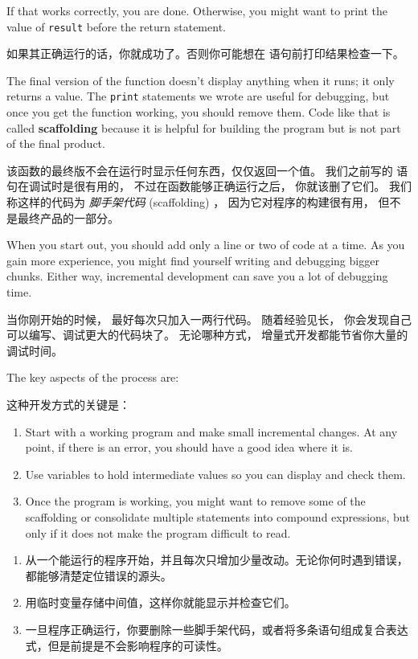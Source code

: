 %
If that works correctly, you are done.  Otherwise, you might
want to print the value of {\tt result} before the return
statement.

如果其正确运行的话，你就成功了。否则你可能想在  语句前打印结果检查一下。

The final version of the function doesn't display anything when it
runs; it only returns a value.  The {\tt print} statements we wrote
are useful for debugging, but once you get the function working, you
should remove them.  Code like that is called {\bf scaffolding}
because it is helpful for building the program but is not part of the
final product.

该函数的最终版不会在运行时显示任何东西，仅仅返回一个值。
我们之前写的  语句在调试时是很有用的， 不过在函数能够正确运行之后， 你就该删了它们。
我们称这样的代码为 {\em 脚手架代码} (scaffolding) ， 因为它对程序的构建很有用， 但不是最终产品的一部分。

When you start out, you should add only a line or two of code at a
time.  As you gain more experience, you might find yourself writing
and debugging bigger chunks.  Either way, incremental development
can save you a lot of debugging time.

当你刚开始的时候， 最好每次只加入一两行代码。
随着经验见长， 你会发现自己可以编写、调试更大的代码块了。
无论哪种方式， 增量式开发都能节省你大量的调试时间。

The key aspects of the process are:

这种开发方式的关键是：


\begin{enumerate}
\item Start with a working program and make small incremental changes.
At any point, if there is an error, you should have a good idea
where it is.

\item Use variables to hold intermediate values so you can
display and check them.

\item Once the program is working, you might want to remove some of
the scaffolding or consolidate multiple statements into compound
expressions, but only if it does not make the program difficult to
read.
\end{enumerate}

\begin{enumerate}
\item 从一个能运行的程序开始，并且每次只增加少量改动。无论你何时遇到错误，都能够清楚定位错误的源头。

\item 用临时变量存储中间值，这样你就能显示并检查它们。

\item 一旦程序正确运行，你要删除一些脚手架代码，或者将多条语句组成复合表达式，但是前提是不会影响程序的可读性。
\end{enumerate}

